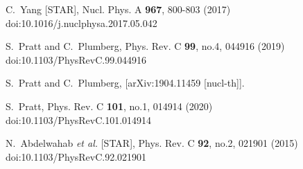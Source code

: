 \begin{thebibliography}{99}
C.~Yang [STAR],
Nucl. Phys. A \textbf{967}, 800-803 (2017)
doi:10.1016/j.nuclphysa.2017.05.042

S.~Pratt and C.~Plumberg,
Phys. Rev. C \textbf{99}, no.4, 044916 (2019)
doi:10.1103/PhysRevC.99.044916

S.~Pratt and C.~Plumberg,
[arXiv:1904.11459 [nucl-th]].


S.~Pratt,
Phys. Rev. C \textbf{101}, no.1, 014914 (2020)
doi:10.1103/PhysRevC.101.014914


N.~Abdelwahab \textit{et al.} [STAR],
Phys. Rev. C \textbf{92}, no.2, 021901 (2015)
doi:10.1103/PhysRevC.92.021901



         
\end{thebibliography}
